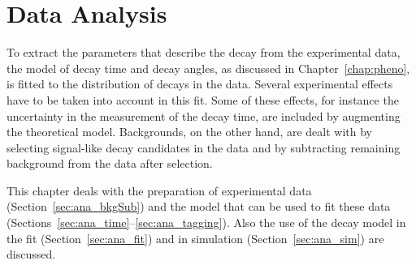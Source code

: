 \chapter{Data Analysis}
\label{chap:ana}

To extract the parameters that describe the \BstoJpsiKK{} decay from the experimental data, the model of decay time and decay angles, as
discussed in Chapter~\ref{chap:pheno}, is fitted to the distribution of decays in the data. Several experimental effects have to be taken
into account in this fit. Some of these effects, for instance the uncertainty in the measurement of the decay time, are included by
augmenting the theoretical model. Backgrounds, on the other hand, are dealt with by selecting signal-like decay candidates in the data and
by subtracting remaining background from the data after selection.

This chapter deals with the preparation of experimental data (Section~\ref{sec:ana_bkgSub}) and the model that can be used to fit these
data (Sections~\ref{sec:ana_time}--\ref{sec:ana_tagging}). Also the use of the decay model in the fit (Section~\ref{sec:ana_fit}) and in
simulation (Section~\ref{sec:ana_sim}) are discussed.








